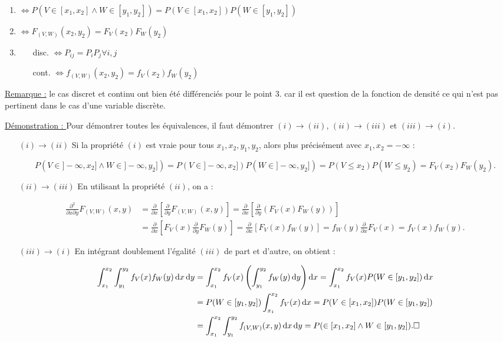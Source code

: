 \documentclass{article}
\renewcommand{\pd}[1]{\frac {\partial}{\partial #1}}
\begin{document}
			\begin{enumerate}
				\item $\iff P(V \in [x_1, x_2] \land W \in [y_1, y_2]) = P(V \in [x_1, x_2])P(W \in [y_1, y_2])$
				\item $\iff F_{(V, W)}(x_2, y_2) = F_V(x_2)F_W(y_2)$
				\item %

					  \begin{enumerate}
						\item[disc.] $\iff P_{ij} = P_iP_j \forall i, j$
						\item[cont.] $\iff f_{(V, W)}(x_2, y_2) = f_V(x_2)f_W(y_2)$
					  \end{enumerate}
			\end{enumerate}

			\underline{Remarque :} le cas discret et continu ont bien été différenciés pour le point $3.$ car il est question de la fonction de densité ce qui n'est pas
			pertinent dans le cas d'une variable discrète.

			\underline{Démonstration : } Pour démontrer toutes les équivalences, il faut démontrer $(i) \rightarrow (ii)$, $(ii) \rightarrow (iii)$ et $(iii) \rightarrow (i)$.

			\begin{itemize}
				\item[$(i) \rightarrow (ii)$] Si la propriété $(i)$ est vraie pour tous $x_1, x_2, y_1, y_2$, alors plus précisément avec $x_1, x_2 = -\infty$ :

					  \[P(V \in ]-\infty, x_2] \land W \in ]-\infty, y_2]) = P(V \in ]-\infty, x_2])P(W \in ]-\infty, y_2]) = P(V \leq x_2)P(W \leq y_2) = F_V(x_2)F_W(y_2).\]

				\item[$(ii) \rightarrow (iii)$] En utilisant la propriété $(ii)$, on a :

					  \[\begin{aligned}
						\frac {\partial^2}{\partial x \partial y}F_{(V, W)}(x, y) &= \pd{x}\left[\pd{y}F_{(V, W)}(x, y)\right] = \pd{x}\left[\pd{y}\left(F_V(x)F_W(y)\right)\right] \\
						&= \pd{x}\left[F_V(x)\pd{y}F_W(y)\right] = \pd{x}[F_V(x)f_W(y)] = f_W(y)\pd{x}F_V(x) = f_V(x)f_W(y).
					  \end{aligned}\]

				\item[$(iii) \rightarrow (i)$] En intégrant doublement l'égalité $(iii)$ de part et d'autre, on obtient :

				\[\begin{aligned}
					\int_{x_1}^{x_2}\int_{y_1}^{y_2}f_V(x)f_W(y)\dif x\dif y &= \int_{x_1}^{x_2}f_V(x)\left(\int_{y_1}^{y_2}f_W(y) \dif y\right)\dif x
						= \int_{x_1}^{x_2}f_V(x)P(W \in [y_1, y_2])\dif x \\
					&= P(W \in [y_1, y_2])\int_{x_1}^{x_2}f_V(x)\dif x = P(V \in [x_1, x_2])P(W \in [y_1, y_2]) \\
					&= \int_{x_1}^{x_2}\int_{y_1}^{y_2}f_{(V, W)}(x, y)\dif x\dif y = P( \in [x_1, x_2] \land W \in [y_1, y_2]). \square
				\end{aligned}\]
			\end{itemize}
\end{document}
